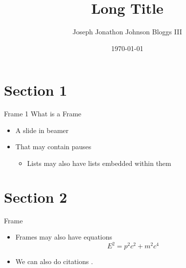 \documentclass[pdf, fleqn, compress]{beamer}
\title[Short Title]{Long Title}
\author[J. Bloggs]{Joseph Jonathon Johnson Bloggs III}
\institute{Institution (Probably York)}
\date{\today}
\begin{document}
\begin{nonavigation}

\begin{frame}
    \titlepage
\end{frame}

\end{nonavigation}


\section{Section 1}

\begin{frame}{Frame 1}
	What is a Frame
	\begin{itemize}
		\item A slide in beamer
		\pause
		\item That may contain pauses
		\begin{itemize}
			\item Lists may also have lists embedded within them
		\end{itemize}
	\end{itemize}
\end{frame}

\section{Section 2}

\begin{frame}{Frame}
	\begin{itemize}
		\item Frames may also have equations
		\begin{equation}
			E^2 = p^2 c^2 + m^2 c^4
		\end{equation}
		\item We can also do citations \cite{knuth1986computers}.
	\end{itemize}
\end{frame}
\end{document}
